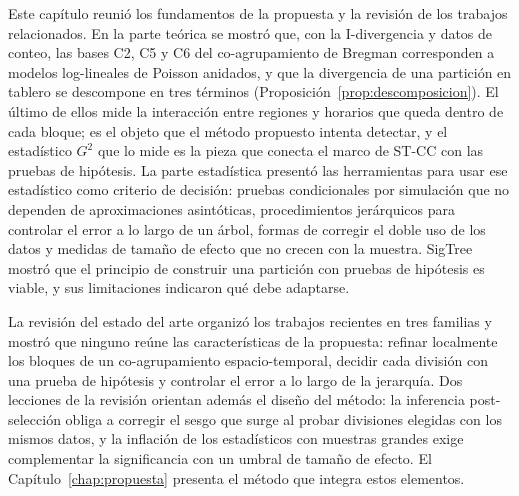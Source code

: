 Este capítulo reunió los fundamentos de la propuesta y la revisión de los
trabajos relacionados. En la parte teórica se mostró que, con la I-divergencia y
datos de conteo, las bases C2, C5 y C6 del co-agrupamiento de Bregman
corresponden a modelos log-lineales de Poisson anidados, y que la divergencia de
una partición en tablero se descompone en tres términos
(Proposición~\ref{prop:descomposicion}). El último de ellos mide la interacción
entre regiones y horarios que queda dentro de cada bloque; es el objeto que el
método propuesto intenta detectar, y el estadístico $G^2$ que lo mide es la pieza
que conecta el marco de \ac{ST-CC} con las pruebas de hipótesis. La parte
estadística presentó las herramientas para usar ese estadístico como criterio de
decisión: pruebas condicionales por simulación que no dependen de aproximaciones
asintóticas, procedimientos jerárquicos para controlar el error a lo largo de un
árbol, formas de corregir el doble uso de los datos y medidas de tamaño de efecto
que no crecen con la muestra. SigTree mostró que el principio de construir una
partición con pruebas de hipótesis es viable, y sus limitaciones indicaron qué
debe adaptarse.

La revisión del estado del arte organizó los trabajos recientes en tres familias
y mostró que ninguno reúne las características de la propuesta: refinar
localmente los bloques de un co-agrupamiento espacio-temporal, decidir cada
división con una prueba de hipótesis y controlar el error a lo largo de la
jerarquía. Dos lecciones de la revisión orientan además el diseño del método: la
inferencia post-selección obliga a corregir el sesgo que surge al probar
divisiones elegidas con los mismos datos, y la inflación de los estadísticos con
muestras grandes exige complementar la significancia con un umbral de tamaño de
efecto. El Capítulo~\ref{chap:propuesta} presenta el método que integra estos
elementos.